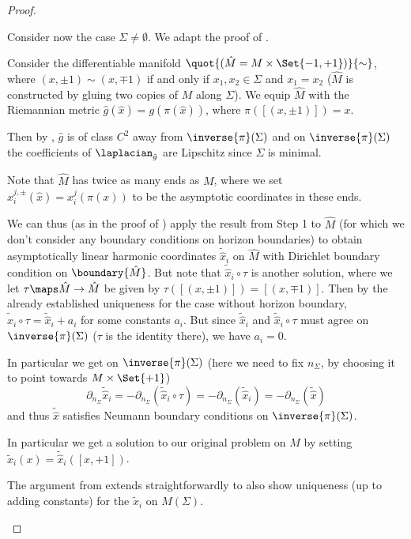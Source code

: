 \documentclass[titlepage,numbers=noenddot,oneside,%
cleardoublepage=empty,paper=a4,fontsize=11pt,%
english,%
]{scrartcl}
\begin{document}
\begin{proof}
\begin{proofenumerate}[label=\textbf{Step \arabic*.}]
        \item Consider now the case \( \Sigma\neq \emptyset \). We adapt the proof of \cite[Proposition 46]{eichmairDoublingAsymptoticallyFlat2023}.

        Consider the differentiable manifold \( \quot{(\hat{M}=M\times \Set{-1,+1})}{\sim} \), where \( (x,\pm 1)\sim (x,\mp 1) \) if and only if \( x_1,x_2\in \Sigma \) and \( x_1=x_2 \) (\ie \( \hat{M} \) is constructed by gluing two copies of \( M \) along \( \Sigma \)). We equip \( \hat{M} \) with the Riemannian metric \( \hat{g}(\hat{x})=g(\pi(\hat{x})) \), where \( \pi([(x,\pm 1)])=x \).
        
        Then by \cite[Lemma 19]{eichmairDoublingAsymptoticallyFlat2023}, \( \hat{g} \) is of class \( C^2 \) away from \( \inverse{\pi}(\Sigma) \) and on \( \inverse{\pi}(\Sigma) \) the coefficients of \( \laplacian_{\tilde{g}} \) are Lipschitz since \( \Sigma \) is minimal.

        Note that \( \hat{M} \) has twice as many ends as \( M \), where we set \( \hat{x}_{i}^{j,\pm}(\hat{x})=x_i^j(\pi(x)) \) to be the asymptotic coordinates in these ends.

        We can thus (as in the proof of \cite[Proposition 46]{eichmairDoublingAsymptoticallyFlat2023}) apply the result from Step 1 to \( \hat{M} \) (for which we don't consider any boundary conditions on horizon boundaries) to obtain asymptotically linear harmonic coordinates \( \tilde{\hat{x}}_i \) on \( \hat{M} \) with Dirichlet boundary condition on \( \boundary{\hat{M}} \). But note that \( \tilde{\hat{x}}_i\circ \tau \) is another solution, where we let \( \tau\maps \hat{M}\to \hat{M} \) be given by \( \tau([(x,\pm 1)])=[(x,\mp 1)] \). Then by the already established uniqueness for the case without horizon boundary, \( \tilde{\hat{x}}_i\circ \tau=\tilde{\hat{x}}_i+a_i \) for some constants \( a_i \). But since \( \tilde{\hat{x}}_i \) and \( \tilde{\hat{x}}_i\circ \tau \) must agree on \( \inverse{\pi}(\Sigma) \) (\( \tau \) is the identity there), we have \( a_i=0 \).
        
        In particular we get on \( \inverse{\pi}(\Sigma) \) (here we need to fix \( n_{\Sigma} \), by \eg choosing it to point towards \( M\times \Set{+1} \))
        \begin{equation*}
            \partial_{n_{\Sigma}}\tilde{\hat{x}}_i=-\partial_{n_\Sigma}(\tilde{\hat{x}}_i\circ \tau)=-\partial_{n_\Sigma}(\tilde{\hat{x}}_i)=-\partial_{n_\Sigma}(\tilde{\hat{x}})
        \end{equation*}
        and thus \( \tilde{\hat{x}} \) satisfies Neumann boundary conditions on \( \inverse{\pi}(\Sigma) \).

        In particular we get a solution to our original problem on \( M \) by setting \( \tilde{x}_i(x)=\tilde{\hat{x}}_i([x,+1]) \).

        The argument from \cite[Proposition 3.9]{eichmairDoublingAsymptoticallyFlat2023} extends straightforwardly to also show uniqueness (up to adding constants) for the \( \tilde{x}_i \) on \( M(\Sigma) \).  
    \end{proofenumerate}
\end{proof}
\end{document}
